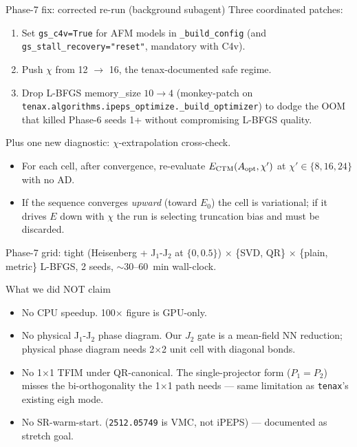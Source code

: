 \documentclass[11pt,aspectratio=169]{beamer}
\newcommand{\tenax}{\texttt{tenax}}
\begin{document}
\begin{frame}{Phase-7 fix: corrected re-run (background subagent)}
  Three coordinated patches:
  \begin{enumerate}
    \item \alert{Set \texttt{gs\_c4v=True}} for AFM models in \texttt{\_build\_config} (and \texttt{gs\_stall\_recovery="reset"}, mandatory with C4v).
    \item \alert{Push $\chi$ from 12 $\to$ 16}, the tenax-documented safe regime.
    \item \alert{Drop L-BFGS memory\_size $10\to 4$} (monkey-patch on \texttt{tenax.algorithms.ipeps\_optimize.\_build\_optimizer}) to dodge the OOM that killed Phase-6 seeds 1+ without compromising L-BFGS quality.
  \end{enumerate}
  \pause
  Plus one new diagnostic: \alert{$\chi$-extrapolation cross-check}.
  \begin{itemize}
    \item For each cell, after convergence, re-evaluate $E_{\rm CTM}(A_{\rm opt}, \chi')$ at $\chi' \in \{8, 16, 24\}$ with no AD.
    \item If the sequence converges \emph{upward} (toward $E_0$) the cell is variational; if it drives $E$ down with $\chi$ the run is selecting truncation bias and must be discarded.
  \end{itemize}
  Phase-7 grid: tight (Heisenberg + J$_1$-J$_2$ at $\{0, 0.5\}$) $\times$ \{SVD, QR\} $\times$ \{plain, metric\} L-BFGS, 2 seeds, $\sim$30--60~min wall-clock.
\end{frame}

\begin{frame}{What we did NOT claim}
  \begin{itemize}
    \item \alert{No CPU speedup.} 100$\times$ figure is GPU-only.
    \item \alert{No physical J$_1$-J$_2$ phase diagram.} Our $J_2$ gate is a mean-field NN reduction; physical phase diagram needs 2$\times$2 unit cell with diagonal bonds.
    \item \alert{No 1$\times$1 TFIM under QR-canonical.} The single-projector form ($P_1{=}P_2$) misses the bi-orthogonality the 1$\times$1 path needs --- same limitation as \tenax's existing eigh mode.
    \item \alert{No SR-warm-start.} (\texttt{2512.05749} is VMC, not iPEPS) --- documented as stretch goal.
  \end{itemize}
\end{frame}
\end{document}

